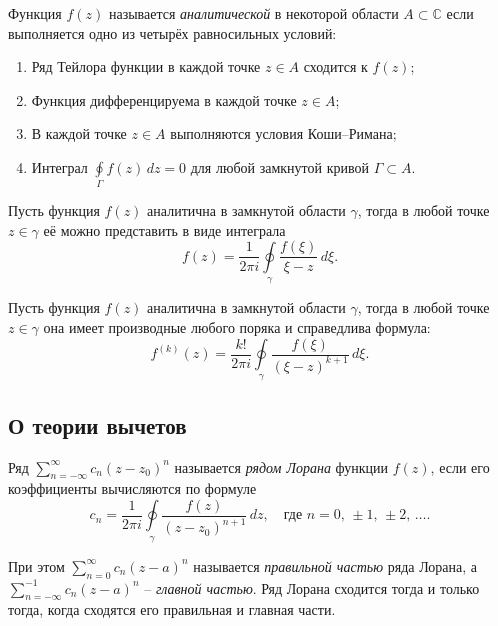 \begin{definition}
        Функция $f(z)$ называется \textit{аналитической} в некоторой области $A \subset \mathbb{C}$ если выполняется одно из четырёх равносильных условий:
        \begin{enumerate}
\item Ряд Тейлора функции в каждой точке $z \in A$ сходится к $f(z)$;
\item Функция дифференцируема в каждой точке $z \in A$;
\item В каждой точке $z \in A$ выполняются условия Коши--Римана;
\item Интеграл $\oint\limits_\Gamma f(z)\,dz = 0$ для любой замкнутой кривой $\Gamma \subset A$.
        \end{enumerate}
\end{definition}

\begin{assertion}
        Пусть функция $f(z)$ аналитична в замкнутой области $\gamma$, тогда в любой точке $z \in \gamma$ её можно представить в виде интеграла
$$
        f(z)
        =
        \frac{1}{2\pi i}\oint\limits_{\gamma}\dfrac{f(\xi)}{\xi-z}\,d\xi.
$$
\end{assertion}
\begin{assertion}
      Пусть функция $f(z)$ аналитична в замкнутой области $\gamma$, тогда в любой точке $z \in \gamma$ она имеет производные любого поряка и справедлива формула:
$$
        f^{(k)}(z)
        =
        \frac{k!}{2\pi i}
        \oint\limits_{\gamma}\frac{f(\xi)}{(\xi-z)^{k+1}}\,d\xi.
$$ 
\end{assertion}


\subsection{О теории вычетов}

\begin{definition}\label{ch1.lor}
Ряд 
$
\sum\limits_{n=-\infty}^{\infty} c_n(z-z_0)^n
$
называется \textit{рядом Лорана} функции $f(z)$, если его коэффициенты вычисляются по формуле
$$
        c_n
        = 
        \frac{1}{2\pi i} 
        \oint\limits_{\gamma}
        \frac{f(z)}{(z-z_0)^{n+1}}\,dz,\quad\mbox{где } n=0,\,\pm1,\,\pm2,\,\ldots.
$$
\end{definition}

\begin{remark} При этом
$\sum_{n=0}^{\infty}c_n(z-a)^n$ называется \textit{правильной частью} ряда Лорана, а
$\sum_{n=-\infty}^{-1}{c_{n}}{(z-a)^n}$ -- \textit{главной частью}. 
Ряд Лорана сходится тогда и только тогда, когда сходятся его правильная и главная части.
\end{remark}

